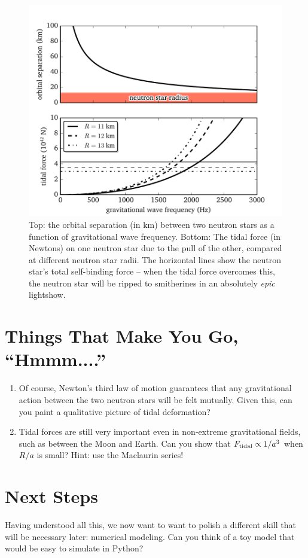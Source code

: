 \documentclass[11pt]{article}
\begin{document}
\begin{figure}
\centering
\includegraphics[scale=1]{newtonian_tidal_forces.pdf}
\caption{\label{fig:NS_tides}Top: the orbital separation (in km) between two neutron stars as a function of gravitational wave frequency. Bottom: The tidal force (in Newtons) on one neutron star due to the pull of the other, compared at different neutron star radii. The horizontal lines show the neutron star's total self-binding force -- when the tidal force overcomes this, the neutron star will be ripped to smitherines in an absolutely \emph{epic} lightshow.}
\end{figure}

\section*{Things That Make You Go, ``Hmmm....''}

\begin{enumerate}

\item Of course, Newton's third law of motion guarantees that any gravitational action between the two neutron stars will be felt mutually. Given this, can you paint a qualitative picture of tidal deformation?

\item Tidal forces are still very important even in non-extreme gravitational fields, such as between the Moon and Earth. Can you show that $F_{\rm tidal} \propto 1/a^3$ when $R/a$ is small? Hint: use the Maclaurin series!

\end{enumerate}

\section*{Next Steps}

\hspace{15pt} Having understood all this, we now want to want to polish a different skill that will be necessary later: numerical modeling. Can you think of a toy model that would be easy to simulate in Python?
\end{document}
